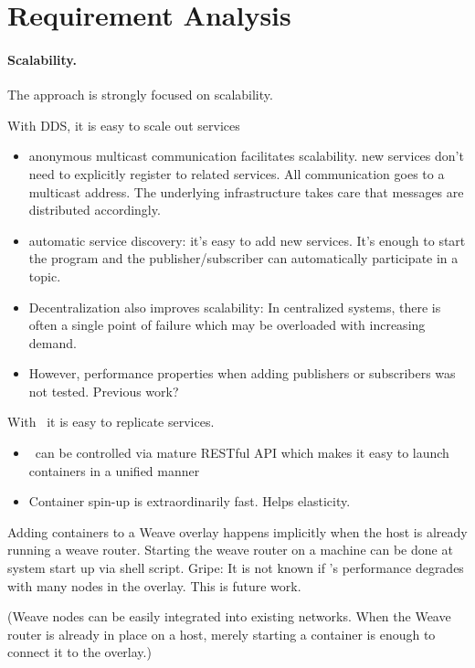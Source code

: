 \section{Requirement Analysis}

\paragraph{Scalability.}
The approach is strongly focused on scalability. 

With DDS, it is easy to scale out services
\begin{itemize}
\item anonymous multicast communication facilitates scalability. new services don't need to explicitly register to related services. All communication goes to a multicast address. The underlying infrastructure takes care that messages are distributed accordingly.
\item automatic service discovery: it's easy to add new services. It's enough to start the program and the publisher/subscriber can automatically participate in a topic.
\item Decentralization also improves scalability: In centralized systems, there is often a single point of failure which may be overloaded with increasing demand. 
\item However, performance properties when adding publishers or subscribers was not tested. Previous work?
\end{itemize}

With \docker\ it is easy to replicate services. 
\begin{itemize}
\item \docker\ can be controlled via mature RESTful API which makes it easy to launch containers in a unified manner
\item Container spin-up is extraordinarily fast. Helps elasticity.
\end{itemize}

Adding containers to a Weave overlay happens implicitly when the host is already running a weave router. Starting the weave router on a machine can be done at system start up via shell script. Gripe: It is not known if \weave 's performance degrades with many nodes in the overlay. This is future work.

(Weave nodes can be easily integrated into existing networks. When the Weave router is already in place on a host, merely starting a container is enough to connect it to the overlay.)

